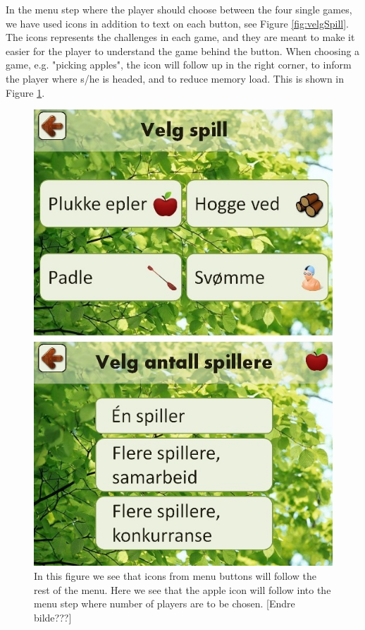 In the menu step where the player should choose between the four single games, we have used icons in addition to text on each button, see Figure \ref{fig:velgSpill}. The icons represents the challenges in each game, and they are meant to make it easier for the player to understand the game behind the button. When choosing a game, e.g. "picking apples", the icon will follow up in the right corner, to inform the player where s/he is headed, and to reduce memory load. This is shown in Figure \ref{fig:iconEple}.  

\begin{figure} [H]
\centering
\includegraphics[scale=0.5]{IconEple.jpg}
\caption[Menu - use of icons]{In this figure we see that icons from menu buttons will follow the rest of the menu. Here we see that the apple icon will follow into the menu step where number of players are to be chosen. [Endre bilde???]}
\label{fig:iconEple}
\end{figure} 
     

